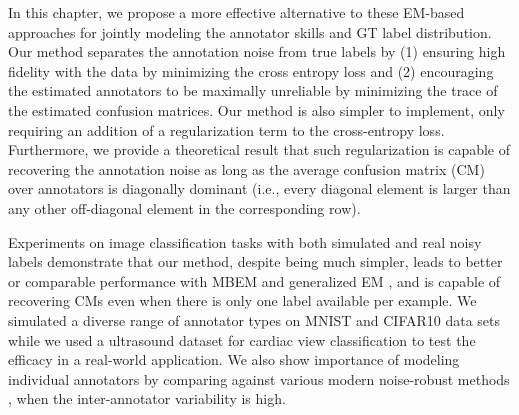 In this chapter, we propose a more effective alternative to these EM-based approaches for jointly modeling the annotator skills and GT label distribution. Our method separates the annotation noise from true labels by
(1) ensuring high fidelity with the data by minimizing the cross entropy loss and (2) encouraging the estimated annotators to be maximally unreliable by minimizing the trace of the estimated confusion matrices. Our method is also simpler to implement, only requiring an addition of a regularization term to the cross-entropy loss. Furthermore, we provide a theoretical result that such regularization is capable of recovering the annotation noise as long as the average confusion matrix (CM) over annotators is diagonally dominant (i.e., every diagonal element is larger than any other off-diagonal element in the corresponding row). 

Experiments on image classification tasks with both simulated and real noisy labels demonstrate that our method, despite being much simpler, leads to better or comparable performance with MBEM \cite{khetan2017learning} and generalized EM \cite{raykar2009supervised,raykar2010learning}, and is capable of recovering CMs even when there is only one label available per example. We simulated a diverse range of annotator types on MNIST and CIFAR10 data sets while we used a ultrasound dataset for cardiac view classification to test the efficacy in a real-world application. We also show importance of modeling individual annotators by comparing against various modern noise-robust methods \cite{reed2014training,sukhbaatar2014training,goldberger2016training,guan2017said}, when the inter-annotator variability is high. 

    
